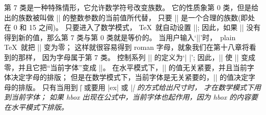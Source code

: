 \ddanger 第 7 类是一种特殊情形，它允许数学符号改变族数。%
它的性质象第 0 类，但是给出的族数被叫做 |\fam| 的整数参数的当前值所代替，
只要 |\fam| 是一个合理的族数(即处在 0 和 15 之间)。%
只要进入了数学模式， \TeX\ 就自动设置 ||;
因此，如果 |\fam| 没有得到新的值，那么第 7 类与第 0 类就是等价的。%
当用户输入`|\rm|'时，~plain \TeX\ 就把 |\fam| 变为零；
这样就很容易得到 roman 字母，就象我们在第十八章将看到的那样，
因为字母属于第 7 类。%
控制系列 |\rm| 的定义为`| \tenrm|';
因此，|\rm| 使 |\fam| 变成零，并且它把``当前字体''变成 |\tenrm|。%
在水平模式下，|\fam| 的值无关紧要，并且当前字体决定字母的排版；
但是在数学模式下，当前字体是无关紧要的，|\fam| 的值决定字母的排版。%
只有当用到 |\|\] 或要用 |ex| 或 |\em| 的方式给出尺寸时，
才在数学模式下用到当前字体；
如果 hbox 出现在公式中，当前字体也起作用，因为 hbox 的内容要在水平模式下排版。

